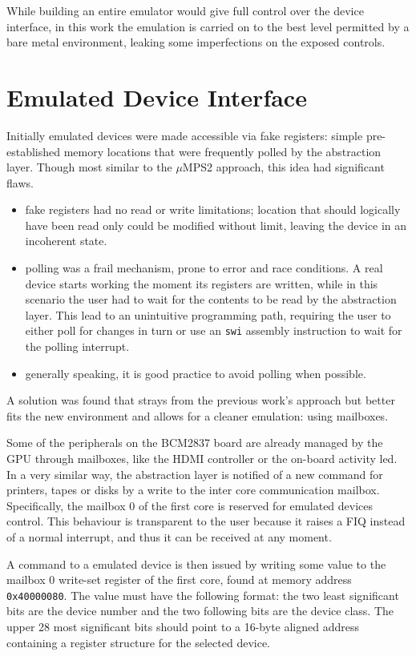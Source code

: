 \documentclass[12pt,a4paper,openright,twoside]{report}
\begin{document}
While building an entire emulator would give full control over the device interface,
in this work the emulation is carried on to the best level permitted by a bare
metal environment, leaking some imperfections on the exposed controls.

\section{Emulated Device Interface}
\label{emulatedinterface}
Initially emulated devices were made accessible via fake registers: simple pre-established
memory locations that were frequently polled by the abstraction layer.
Though most similar to the $\mu$MPS2 approach, this idea had significant flaws.
\begin{itemize}
    \item fake registers had no read or write limitations; location that should
        logically have been read only could be modified without limit, leaving
        the device in an incoherent state.
    \item polling was a frail mechanism, prone to error and race conditions. 
         A real device starts working the moment
        its registers are written, while in this scenario the user had to wait 
        for the contents to be read by the abstraction layer. This lead to 
        an unintuitive programming path, requiring the user to either poll 
        for changes in turn or use an {\tt swi} assembly instruction to wait for
        the polling interrupt.
    \item generally speaking, it is good practice to avoid polling when possible.
\end{itemize}

A solution was found that strays from the previous work's approach but better
fits the new environment and allows for a cleaner emulation: using mailboxes.

Some of the peripherals on the BCM2837 board are already managed by the GPU
through mailboxes, like the HDMI controller or the on-board activity led. In 
a very similar way, the abstraction layer is notified of a new command for printers,
tapes or disks by a write to the inter core communication mailbox.
Specifically, the mailbox 0 of the first core is reserved for emulated devices control.
This behaviour is transparent to the user because it raises a FIQ instead of a 
normal interrupt, and thus it can be received at any moment.

A command to a emulated device is then issued by writing some value to the mailbox
0 write-set register of the first core, found at memory address {\tt 0x40000080}.
The value must have the following format: the two least significant bits are the
device number and the two following bits are the device class.
The upper 28 most significant bits should point to a 16-byte aligned address containing
a register structure for the selected device.
\end{document}

